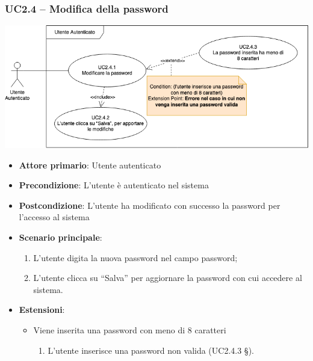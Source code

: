 \subsubsection{UC2.4 – Modifica della password}
\begin{center}
\includegraphics[scale=0.5]{UC_images/UC2_4.png}
\end{center}
\begin{itemize}
\item \textbf{Attore primario}: Utente autenticato
\item \textbf{Precondizione}: L’utente è autenticato nel sistema
\item \textbf{Postcondizione}: L’utente ha modificato con successo la password per l’accesso al sistema

\item \textbf{Scenario principale}:
\begin{enumerate}
\item L’utente digita la nuova password nel campo password;
\item L’utente clicca su “Salva” per aggiornare la password con cui accedere al sistema.
\end{enumerate}

\item \textbf{Estensioni}:
\begin{itemize}
\item Viene inserita una password con meno di 8 caratteri
\begin{enumerate}
	\item L'utente inserisce una password non valida (UC2.4.3 §).
\end{enumerate}
\end{itemize}
\end{itemize}